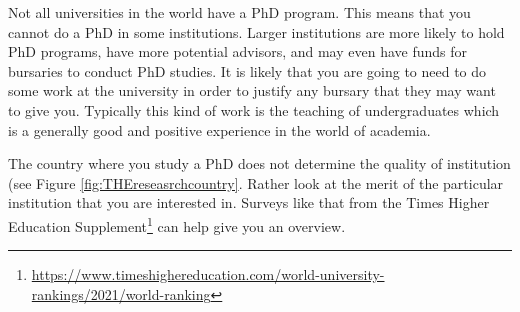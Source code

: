 \documentclass[
]{krantz}
\renewcommand{\href}[2]{#2\footnote{\url{#1}}}
\begin{document}
Not all universities in the world have a PhD program. This means that you cannot do a PhD in some institutions. Larger institutions are more likely to hold PhD programs, have more potential advisors, and may even have funds for bursaries to conduct PhD studies. It is likely that you are going to need to do some work at the university in order to justify any bursary that they may want to give you. Typically this kind of work is the teaching of undergraduates which is a generally good and positive experience in the world of academia.

The country where you study a PhD does not determine the quality of institution (see Figure \ref{fig:THEreseasrchcountry}. Rather look at the merit of the particular institution that you are interested in. Surveys like that from the \href{https://www.timeshighereducation.com/world-university-rankings/2021/world-ranking}{Times Higher Education Supplement} can help give you an overview.
\end{document}
